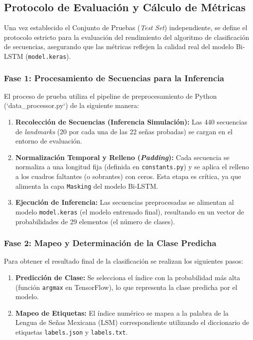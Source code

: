 \subsection{Protocolo de Evaluación y Cálculo de Métricas}
\label{sec:protocolo_metrico}

Una vez establecido el Conjunto de Pruebas (\textit{Test Set}) independiente, se define el protocolo estricto para la evaluación del rendimiento del algoritmo de clasificación de secuencias, asegurando que las métricas reflejen la calidad real del modelo Bi-LSTM (\texttt{model.keras}).

\subsubsection*{Fase 1: Procesamiento de Secuencias para la Inferencia}

El proceso de prueba utiliza el pipeline de preprocesamiento de Python (`data_processor.py`) de la siguiente manera:
\begin{enumerate}
    \item \textbf{Recolección de Secuencias (Inferencia Simulación):} Las 440 secuencias de \textit{landmarks} (20 por cada una de las 22 señas probadas) se cargan en el entorno de evaluación.
    \item \textbf{Normalización Temporal y Relleno (\textit{Padding}):} Cada secuencia se normaliza a una longitud fija (definida en \texttt{constants.py}) y se aplica el relleno a los cuadros faltantes (o sobrantes) con ceros. Esta etapa es crítica, ya que alimenta la capa \texttt{Masking} del modelo Bi-LSTM.
    \item \textbf{Ejecución de Inferencia:} Las secuencias preprocesadas se alimentan al modelo \texttt{model.keras} (el modelo entrenado final), resultando en un vector de probabilidades de 29 elementos (el número de clases).
\end{enumerate}

\subsubsection*{Fase 2: Mapeo y Determinación de la Clase Predicha}

Para obtener el resultado final de la clasificación se realizan los siguientes pasos:
\begin{enumerate}
    \item \textbf{Predicción de Clase:} Se selecciona el índice con la probabilidad más alta (función \texttt{argmax} en TensorFlow), lo que representa la clase predicha por el modelo.
    \item \textbf{Mapeo de Etiquetas:} El índice numérico se mapea a la palabra de la Lengua de Señas Mexicana (LSM) correspondiente utilizando el diccionario de etiquetas \texttt{labels.json} y \texttt{labels.txt}.
\end{enumerate}

